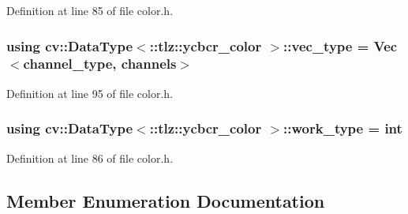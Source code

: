 Definition at line 85 of file color.\+h.

\subsubsection[{\texorpdfstring{vec\+\_\+type}{vec_type}}]{\setlength{\rightskip}{0pt plus 5cm}using cv\+::\+Data\+Type$<$\+::{\bf tlz\+::ycbcr\+\_\+color} $>$\+::{\bf vec\+\_\+type} =  Vec$<${\bf channel\+\_\+type}, {\bf channels}$>$}\hypertarget{classcv_1_1DataType_3_1_1tlz_1_1ycbcr__color_01_4_a44726d733a4888230d5a1645075befb1}{}\label{classcv_1_1DataType_3_1_1tlz_1_1ycbcr__color_01_4_a44726d733a4888230d5a1645075befb1}


Definition at line 95 of file color.\+h.

\subsubsection[{\texorpdfstring{work\+\_\+type}{work_type}}]{\setlength{\rightskip}{0pt plus 5cm}using cv\+::\+Data\+Type$<$\+::{\bf tlz\+::ycbcr\+\_\+color} $>$\+::{\bf work\+\_\+type} =  int}\hypertarget{classcv_1_1DataType_3_1_1tlz_1_1ycbcr__color_01_4_acddb0f0b4cd277043c750c1fe7ff48f6}{}\label{classcv_1_1DataType_3_1_1tlz_1_1ycbcr__color_01_4_acddb0f0b4cd277043c750c1fe7ff48f6}


Definition at line 86 of file color.\+h.



\subsection{Member Enumeration Documentation}
